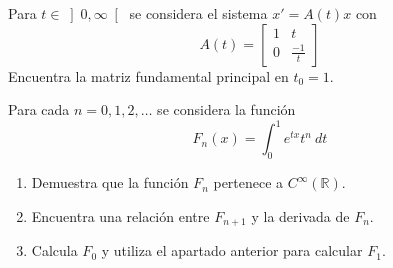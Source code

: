 \documentclass[12pt]{article}
\begin{document}
    \begin{ejercicio}
        Para $t\in \left]0,\infty\right[$ se considera el sistema $x'=A(t)x$ con
        \begin{equation*}
            A(t) = \left[\begin{array}{cc}
                    1 & t \\
                    0 & \frac{-1}{t}
            \end{array}\right]
        \end{equation*}
        Encuentra la matriz fundamental principal en $t_0=1$.
    \end{ejercicio}

    \begin{ejercicio}
        Para cada $n=0,1,2,\ldots$ se considera la función
        \begin{equation*}
            F_n(x) = \int_{0}^{1} e^{tx}t^n~dt 
        \end{equation*}
        \begin{enumerate}[label=\alph*)]
            \item Demuestra que la función $F_n$ pertenece a $C^\infty(\mathbb{R})$.
            \item Encuentra una relación entre $F_{n+1}$ y la derivada de $F_n$.
            \item Calcula $F_0$ y utiliza el apartado anterior para calcular $F_1$.
        \end{enumerate}
    \end{ejercicio}
\end{document}

